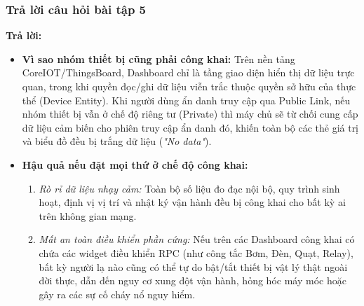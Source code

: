 \subsubsection{Trả lời câu hỏi bài tập 5}
\begin{tcolorbox}[colback=blue!5,colframe=blue!75!black,title=\textbf{Câu hỏi 5: Vì sao nhóm thiết bị cũng phải ở chế độ công khai? Điều gì có thể xảy ra nếu bạn đặt mọi dashboard và thiết bị trong tài khoản của mình ở chế độ công khai?}]
\textbf{Trả lời:}
\begin{itemize}
    \item \textbf{Vì sao nhóm thiết bị cũng phải công khai:} Trên nền tảng CoreIOT/ThingsBoard, Dashboard chỉ là tầng giao diện hiển thị dữ liệu trực quan, trong khi quyền đọc/ghi dữ liệu viễn trắc thuộc quyền sở hữu của thực thể (Device Entity). Khi người dùng ẩn danh truy cập qua Public Link, nếu nhóm thiết bị vẫn ở chế độ riêng tư (Private) thì máy chủ sẽ từ chối cung cấp dữ liệu cảm biến cho phiên truy cập ẩn danh đó, khiến toàn bộ các thẻ giá trị và biểu đồ đều bị trắng dữ liệu (\textit{"No data"}).
    \item \textbf{Hậu quả nếu đặt mọi thứ ở chế độ công khai:}
    \begin{enumerate}
        \item \textit{Rò rỉ dữ liệu nhạy cảm:} Toàn bộ số liệu đo đạc nội bộ, quy trình sinh hoạt, định vị vị trí và nhật ký vận hành đều bị công khai cho bất kỳ ai trên không gian mạng.
        \item \textit{Mất an toàn điều khiển phần cứng:} Nếu trên các Dashboard công khai có chứa các widget điều khiển RPC (như công tắc Bơm, Đèn, Quạt, Relay), bất kỳ người lạ nào cũng có thể tự do bật/tắt thiết bị vật lý thật ngoài đời thực, dẫn đến nguy cơ xung đột vận hành, hỏng hóc máy móc hoặc gây ra các sự cố cháy nổ nguy hiểm.
    \end{enumerate}
\end{itemize}
\end{tcolorbox}
